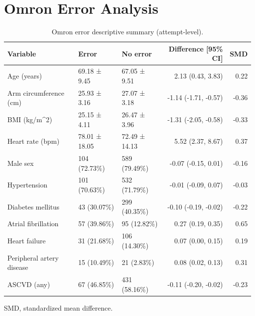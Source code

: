\documentclass[
  12pt,
  letterpaper,
  openany,
  oneside]{book}
\begin{document}
\clearpage

\section{Omron Error Analysis}\label{omron-error-analysis}

\begin{table}
\caption{Omron error descriptive summary (attempt-level).}\tabularnewline

\fontsize{10.0pt}{13.0pt}\selectfont
\begin{tabular*}{1\linewidth}{@{\extracolsep{\fill}}lllrr}
\toprule
{\bfseries Variable} & {\bfseries Error} & {\bfseries No error} & {\bfseries Difference
[95\% CI]} & {\bfseries SMD} \\ 
\midrule\addlinespace[2.5pt]
Age (years) & 69.18 ± 9.45 & 67.05 ± 9.51 & 2.13 (0.43, 3.83) & 0.22 \\ 
Arm circumference (cm) & 25.93 ± 3.16 & 27.07 ± 3.18 & -1.14 (-1.71, -0.57) & -0.36 \\ 
BMI (kg/m\textasciicircum{}2) & 25.15 ± 4.11 & 26.47 ± 3.96 & -1.31 (-2.05, -0.58) & -0.33 \\ 
Heart rate (bpm) & 78.01 ± 18.05 & 72.49 ± 14.13 & 5.52 (2.37, 8.67) & 0.37 \\ 
Male sex & 104 (72.73\%) & 589 (79.49\%) & -0.07 (-0.15, 0.01) & -0.16 \\ 
Hypertension & 101 (70.63\%) & 532 (71.79\%) & -0.01 (-0.09, 0.07) & -0.03 \\ 
Diabetes mellitus & 43 (30.07\%) & 299 (40.35\%) & -0.10 (-0.19, -0.02) & -0.22 \\ 
Atrial fibrillation & 57 (39.86\%) & 95 (12.82\%) & 0.27 (0.19, 0.35) & 0.65 \\ 
Heart failure & 31 (21.68\%) & 106 (14.30\%) & 0.07 (0.00, 0.15) & 0.19 \\ 
Peripheral artery disease & 15 (10.49\%) & 21 (2.83\%) & 0.08 (0.02, 0.13) & 0.31 \\ 
ASCVD (any) & 67 (46.85\%) & 431 (58.16\%) & -0.11 (-0.20, -0.02) & -0.23 \\ 
\bottomrule
\end{tabular*}
\begin{minipage}{\linewidth}
\vspace{.05em}
SMD, standardized mean difference.\\
\end{minipage}
\end{table}
\end{document}
